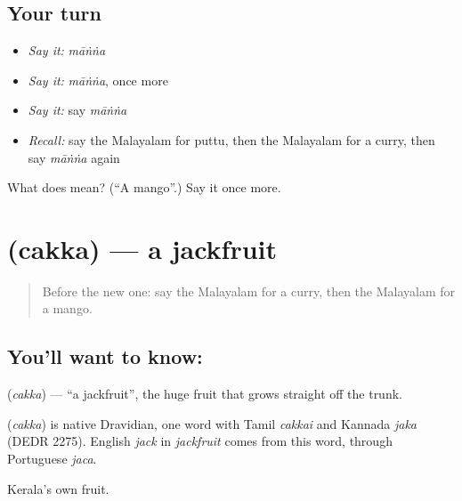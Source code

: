 \subsection*{Your turn}
\begin{itemize}
\raggedright
  \item \emph{Say it:} \emph{māṅṅa}
  \item \emph{Say it:} \emph{māṅṅa}, once more
  \item \emph{Say it:} say \emph{māṅṅa}
  \item \emph{Recall:} say the Malayalam for puttu, then the Malayalam for a curry, then say \emph{māṅṅa} again
\end{itemize}

\begin{tcolorbox}[breakable,colback=teal!4,colframe=teal!35!black,title={Before you move on}]
What does  mean? (\textquotedblleft{}A mango\textquotedblright{}.) Say it once more.
\end{tcolorbox}
\section[\texorpdfstring{\ml{ചക്ക} (cakka)}{ചക്ക (cakka)}]{ (cakka) — a jackfruit}

\label{lesson:ML-C133-jackfruit}



\begin{quote}
Before the new one: say the Malayalam for a curry, then the Malayalam for a mango.
\end{quote}

\subsection*{You'll want to know: }
\textbf{} (\emph{cakka}) — \textquotedblleft{}a jackfruit\textquotedblright{}, the huge fruit that grows straight off the trunk.

\begin{cousinweb}
\textbf{} (\emph{cakka}) is native Dravidian, one word with Tamil \emph{cakkai} and Kannada \emph{jaka} (DEDR 2275). English \emph{jack} in \emph{jackfruit} comes from this word, through Portuguese \emph{jaca}.
\end{cousinweb}

\begin{grammarlens}[title={What you've built}]
Kerala's own fruit.
\end{grammarlens}

